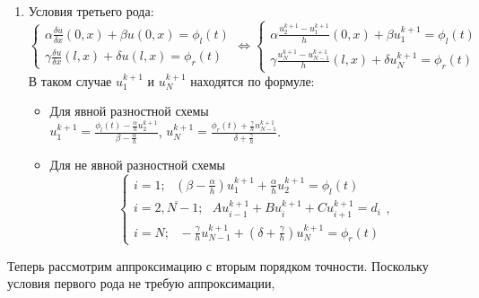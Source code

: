 \documentclass[12pt]{article}
\begin{document}
\begin{enumerate}
        \item Условия третьего рода:
            \begin{equation*}
                \begin{cases}
                    \alpha\frac{\delta u}{\delta x}(0,x) + \beta u(0,x)= \phi_l(t)
                    \\
                    \gamma\frac{\delta u}{\delta x}(l,x) + \delta u(l,x)= \phi_r(t)
                \end{cases}
                \Leftrightarrow
                \begin{cases}
                    \alpha\frac{u_{2}^{k+1}-u_{1}^{k+1}}{h}(0,x) + \beta u_{1}^{k+1} = \phi_l(t)
                    \\
                    \gamma\frac{u_{N}^{k+1}-u_{N-1}^{k+1}}{h}(l,x) + \delta u_{N}^{k+1}= \phi_r(t)
                \end{cases}
            \end{equation*}
            В таком случае $u_1^{k+1}$ и $u_N^{k+1}$ находятся по формуле:
            \begin{itemize}
                \item Для явной разностной схемы\\
                $u_1^{k+1}=\frac{\phi_l(t)-\frac{\alpha}{h}u_2^{k+1}}{\beta-\frac{\alpha}{h}}$, 
                $u_N^{k+1}=\frac{\phi_r(t)+\frac{\gamma}{h}n_{N-1}^{k+1}}{\delta+\frac{\gamma}{h}}$.
                \item Для не явной разностной схемы\\
                \begin{equation*}
                    \begin{cases}
                        i=1;\:\:\: \left(\beta-\frac{\alpha}{h}\right)u_1^{k+1} +\frac{\alpha}{h}u_{2}^{k+1}=\phi_l(t)
                        \\
                        i=\overline{2,N-1};\:\:\:Au_{i-1}^{k+1} + Bu_i^{k+1} +Cu_{i+1}^{k+1}=d_i
                        \\
                        i=N;\:\:\: -\frac{\gamma}{h}u_{N-1}^{k+1} + \left(\delta+\frac{\gamma}{h}\right)u_N^{k+1} =\phi_r(t)
                    \end{cases},
                \end{equation*}
            \end{itemize}
    \end{enumerate}
    Теперь рассмотрим аппроксимацию с вторым порядком точности. Поскольку условия первого рода не требую аппроксимации, 
\end{document}
